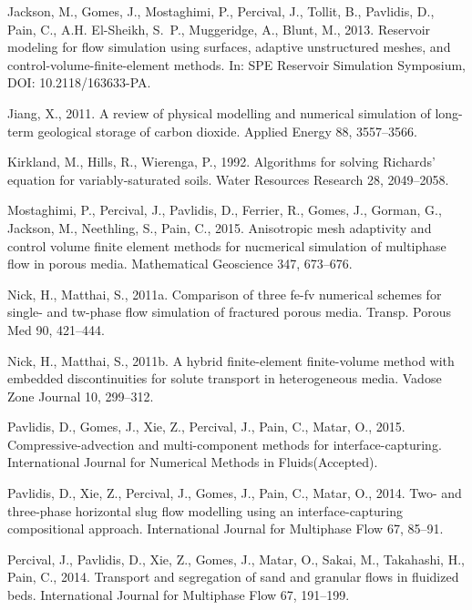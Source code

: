 \documentclass[times]{fldauth}
\begin{document}
\begin{thebibliography}{9}
Jackson, M., Gomes, J., Mostaghimi, P., Percival, J., Tollit, B., Pavlidis, D.,
  Pain, C., A.H. El-Sheikh, S.~P., Muggeridge, A., Blunt, M., 2013. Reservoir
  modeling for flow simulation using surfaces, adaptive unstructured meshes,
  and control-volume-finite-element methods. In: SPE Reservoir Simulation
  Symposium, DOI: 10.2118/163633-PA.

Jiang, X., 2011. A review of physical modelling and numerical simulation of
  long-term geological storage of carbon dioxide. Applied Energy 88,
  3557--3566.

Kirkland, M., Hills, R., Wierenga, P., 1992. Algorithms for solving {R}ichards'
  equation for variably-saturated soils. Water Resources Research 28,
  2049--2058.

Mostaghimi, P., Percival, J., Pavlidis, D., Ferrier, R., Gomes, J., Gorman, G.,
  Jackson, M., Neethling, S., Pain, C., 2015. Anisotropic mesh adaptivity and
  control volume finite element methods for nucmerical simulation of multiphase
  flow in porous media. Mathematical Geoscience 347, 673--676.

Nick, H., Matthai, S., 2011a. Comparison of three fe-fv numerical
  schemes for single- and tw-phase flow simulation of fractured porous media.
  Transp. Porous Med 90, 421--444.

Nick, H., Matthai, S., 2011b. A hybrid finite-element
  finite-volume method with embedded discontinuities for solute transport in
  heterogeneous media. Vadose Zone Journal 10, 299--312.

Pavlidis, D., Gomes, J., Xie, Z., Percival, J., Pain, C., Matar, O., 2015.
  Compressive-advection and multi-component methods for interface-capturing.
  International Journal for Numerical Methods in Fluids\;(Accepted).

Pavlidis, D., Xie, Z., Percival, J., Gomes, J., Pain, C., Matar, O., 2014. Two-
  and three-phase horizontal slug flow modelling using an interface-capturing
  compositional approach. International Journal for Multiphase Flow 67, 85--91.

Percival, J., Pavlidis, D., Xie, Z., Gomes, J., Matar, O., Sakai, M.,
  Takahashi, H., Pain, C., 2014. Transport and segregation of sand and granular
  flows in fluidized beds. International Journal for Multiphase Flow 67,
  191--199.


\end{thebibliography}
\end{document}
